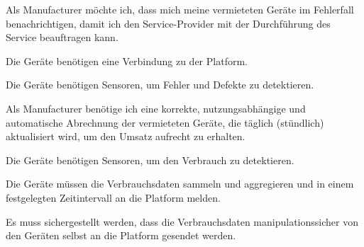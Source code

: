 \begin{tcolorbox}[colback=white,colframe=MidnightBlue!50!black, colbacktitle=MidnightBlue!75!black,title=\textbf{\underline{M5} Benachrichtigung im Fehlerfall}]
  \label{req:m5}
  \glqq Als Manufacturer möchte ich, dass mich meine vermieteten Geräte im Fehlerfall benachrichtigen, damit ich den Service-Provider mit der Durchführung des Service beauftragen kann. \grqq
  \tcblower
  \begin{tcolorbox}[colback=white,colframe=white!50!black, colbacktitle=white!75!black,title=Task M5.1]
    Die Geräte benötigen eine Verbindung zu der Platform.
  \end{tcolorbox}
  \begin{tcolorbox}[colback=white,colframe=white!50!black, colbacktitle=white!75!black,title=Task M5.2]
    Die Geräte benötigen Sensoren, um Fehler und Defekte zu detektieren.
  \end{tcolorbox}
\end{tcolorbox}

\begin{tcolorbox}[colback=white,colframe=MidnightBlue!50!black, colbacktitle=MidnightBlue!75!black,title=\textbf{\underline{M6} Abrechnung}]
  \label{req:m6}
  \glqq Als Manufacturer benötige ich eine korrekte, nutzungsabhängige und automatische Abrechnung der vermieteten Geräte, die täglich (stündlich) aktualisiert wird, um den Umsatz aufrecht zu erhalten. \grqq
  \tcblower
  \begin{tcolorbox}[colback=white,colframe=white!50!black, colbacktitle=white!75!black,title=Task M6.1]
    Die Geräte benötigen Sensoren, um den Verbrauch zu detektieren.
  \end{tcolorbox}
  \begin{tcolorbox}[colback=white,colframe=white!50!black, colbacktitle=white!75!black,title=Task M6.2]
    Die Geräte müssen die Verbrauchsdaten sammeln und aggregieren und in einem festgelegten Zeitintervall an die Platform melden.
  \end{tcolorbox}
  \begin{tcolorbox}[colback=white,colframe=white!50!black, colbacktitle=white!75!black,title=Task M6.3]
    Es muss sichergestellt werden, dass die Verbrauchsdaten manipulationssicher von den Geräten selbst an die Platform gesendet werden.
  \end{tcolorbox}
\end{tcolorbox}

